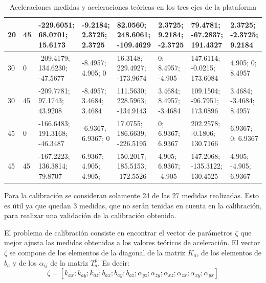 \documentclass[main]{subfiles}
\begin{document}
\begin{table}[H]
\begin{tiny}
\begin{tabular}{p{30pt}p{30pt}|p{40pt}|p{26pt}|p{40pt}|p{26pt}|p{40pt}|p{26pt}|}
\multicolumn{1}{|p{30pt}|}{20} & 45 &   -229.6051;     68.0701;    15.6173 & -9.2184;    2.3725;    2.3725 & 82.0560;       248.6061;     -109.4629 & 2.3725;    9.2184;    -2.3725 & 79.4781;    -67.2837;     191.4327 & 2.3725;    -2.3725;	9.2184    \\ \hline
\multicolumn{1}{|p{30pt}|}{30} & 0  &  -209.4179;    134.6230;    -47.5677 &       -8.4957;     4.905;    0 & 16.3148;    229.4927;     -173.9674 & 0;		8.4957;		-4.905 & 147.6114;    -0.0215;    173.6084 &  4.905;    0;	8.4957\\ \hline
\multicolumn{1}{|p{30pt}|}{30} & 45 & -209.7781;    97.1743;    43.9208 & -8.4957;    3.4684;    3.4684 & 111.5630;       228.5963;     -134.9143 & 3.4684;    8.4957;	-3.4684 & 109.1504;       -96.7951;     173.0896 & 3.4684;    -3.4684;    8.4957\\ \hline
\multicolumn{1}{|p{30pt}|}{45} & 0  &  -166.6483;    191.3168;    -46.3487 &       -6.9367;    6.9367;    0 & 17.0755;      186.6639;      -226.5195 & 0;          6.9367;    6.9367 & 202.2578;    -0.1806;    130.7166 & 6.9367;    0;         6.9367\\ \hline
\multicolumn{1}{|p{30pt}|}{45} & 45 & -167.2223;    136.3814;    79.8707 &  6.9367;	4.905;     4.905;     & 150.2017;       185.5153;     -172.5526 & 4.905;    6.9367; -4.905      & 147.2068;    -135.3122;     130.4525 &  4.905;    -4.905;	6.9367     \\ \hline


\end{tabular}
\end{tiny}
\caption{Aceleraciones medidas y aceleraciones teóricas en los tres ejes de la plataforma}
\label{tab:acc}
\end{table} 

Para la calibración se consideran solamente 24 de las 27 medidas realizadas. Esto es útil ya que quedan 3 medidas, que no serán tenidas en cuenta en la calibración, para realizar una validaci\'on de la calibración obtenida.

El problema de calibración consiste en encontrar el vector de parámetros $\zeta$ que mejor ajusta las medidas obtenidas a los valores teóricos de aceleración. El vector $\zeta$ se compone de los elementos de la diagonal de la matriz $K_a$, de los elementos de $b_a$ y de los $\alpha_{ij}$ de la matriz $T_a^p$. Es decir: 
\begin{equation}
\zeta =\left[ k_{ax} ; k_{ay} ; k_{az} ;b_{ax} ;b_{ay} ;b_{az}; \alpha_{yz} ; \alpha_{zy} ; \alpha_{xz} ; \alpha_{zx} ; \alpha_{xy} ; \alpha_{yx} \right]\end{equation}
\end{document}
